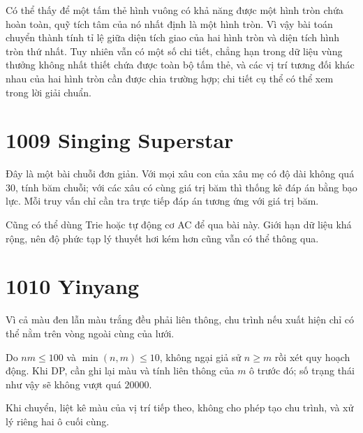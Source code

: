 \documentclass[11pt]{article}
\begin{document}
Có thể thấy để một tấm thẻ hình vuông có khả năng được một hình tròn chứa hoàn
toàn, quỹ tích tâm của nó nhất định là một hình tròn. Vì vậy bài toán chuyển
thành tính tỉ lệ giữa diện tích giao của hai hình tròn và diện tích hình tròn
thứ nhất. Tuy nhiên vẫn có một số chi tiết, chẳng hạn trong dữ liệu vùng
thưởng không nhất thiết chứa được toàn bộ tấm thẻ, và các vị trí tương đối
khác nhau của hai hình tròn cần được chia trường hợp; chi tiết cụ thể có thể
xem trong lời giải chuẩn.

\section*{1009 Singing Superstar}

Đây là một bài chuỗi đơn giản. Với mọi xâu con của xâu mẹ có độ dài không quá
$30$, tính băm chuỗi; với các xâu có cùng giá trị băm thì thống kê đáp án
bằng bạo lực. Mỗi truy vấn chỉ cần tra trực tiếp đáp án tương ứng với giá trị
băm.

Cũng có thể dùng Trie hoặc tự động cơ AC để qua bài này. Giới hạn dữ liệu khá
rộng, nên độ phức tạp lý thuyết hơi kém hơn cũng vẫn có thể thông qua.

\section*{1010 Yinyang}

Vì cả màu đen lẫn màu trắng đều phải liên thông, chu trình nếu xuất hiện chỉ
có thể nằm trên vòng ngoài cùng của lưới.

Do $nm\le 100$ và $\min(n,m)\le 10$, không ngại giả sử $n\ge m$ rồi xét quy
hoạch động. Khi DP, cần ghi lại màu và tính liên thông của $m$ ô trước đó; số
trạng thái như vậy sẽ không vượt quá $20000$.

Khi chuyển, liệt kê màu của vị trí tiếp theo, không cho phép tạo chu trình, và
xử lý riêng hai ô cuối cùng.
\end{document}
